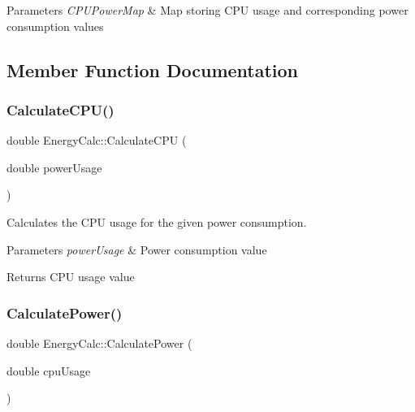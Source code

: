 \begin{DoxyParams}{Parameters}
{\em C\+P\+U\+Power\+Map} & Map storing C\+PU usage and corresponding power consumption values \\
\hline
\end{DoxyParams}


\subsection{Member Function Documentation}
\mbox{\label{classEnergyCalc_a73932d67b6f571d004d0cebca5b76621}} 
\subsubsection{\texorpdfstring{Calculate\+C\+P\+U()}{CalculateCPU()}}
{\footnotesize\ttfamily double Energy\+Calc\+::\+Calculate\+C\+PU (\begin{DoxyParamCaption}\item[{double}]{power\+Usage }\end{DoxyParamCaption})}



Calculates the C\+PU usage for the given power consumption. 


\begin{DoxyParams}{Parameters}
{\em power\+Usage} & Power consumption value \\
\hline
\end{DoxyParams}
\begin{DoxyReturn}{Returns}
C\+PU usage value 
\end{DoxyReturn}
\mbox{\label{classEnergyCalc_a7b110beba82144d475b2d0fc3040762a}} 
\subsubsection{\texorpdfstring{Calculate\+Power()}{CalculatePower()}}
{\footnotesize\ttfamily double Energy\+Calc\+::\+Calculate\+Power (\begin{DoxyParamCaption}\item[{double}]{cpu\+Usage }\end{DoxyParamCaption})}



